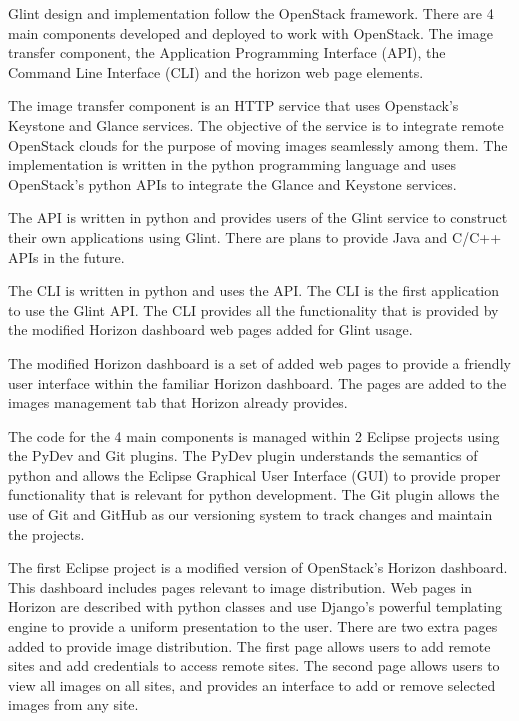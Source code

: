 \documentclass[a4paper]{jpconf}
\begin{document}
Glint design and implementation follow the OpenStack framework. There are 4 main components developed and deployed to work with OpenStack. The image transfer component, the Application Programming Interface (API), the Command Line Interface (CLI) and the horizon web page elements. 

The image transfer component is an HTTP service that uses Openstack's Keystone and Glance services. The objective of the service is to integrate remote OpenStack clouds for the purpose of moving images seamlessly among them. The implementation is written in the python programming language and uses OpenStack's python APIs to integrate the Glance and Keystone services.

The API is written in python and provides users of the Glint service to construct their own applications using Glint. There are plans to provide Java and C/C++ APIs in the future.

The CLI is written in python and uses the API. The CLI is the first application to use the Glint API. The CLI provides all the functionality that is provided by the modified Horizon dashboard web pages added for Glint usage.

The modified Horizon dashboard is a set of added web pages to provide a friendly user interface within the familiar Horizon dashboard. The pages are added to the images management tab that Horizon already provides. 

The code for the 4 main components is managed within 2 Eclipse projects using the PyDev and Git plugins. The PyDev plugin understands the semantics of python and allows the Eclipse Graphical User Interface (GUI) to provide proper functionality that is relevant for python development. The Git plugin allows the use of Git and GitHub as our versioning system to track changes and maintain the projects. 

The first Eclipse project is a modified version of OpenStack's Horizon dashboard. This dashboard includes pages relevant to image distribution. Web pages in Horizon are described with python classes and use Django's powerful templating engine to provide a uniform presentation to the user. There are two extra pages added to provide image distribution. The first page allows users to add remote sites and add credentials to access remote sites. The second page allows users to view all images on all sites, and provides an interface to add or remove selected images from any site.
\end{document}
